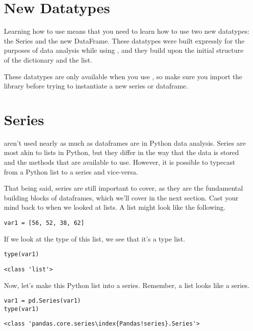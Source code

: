 \section{New Datatypes}
Learning how to use  means that you need to learn how to use two new datatypes: the Series and the new DataFrame. These datatypes were built expressly for the purposes of data analysis while using , and they build upon the initial structure of the dictionary and the list.\par
These datatypes are only available when you use , so make sure you import the  library before trying to instantiate a new series or dataframe.
\section{Series}
 aren't used nearly as much as dataframes are in Python data analysis. Series are most akin to lists in Python, but they differ in the way that the data is stored and the methods that are available to use. However, it is possible to typecast from a Python list to a  series and vice-versa.\par
That being said, series are still important to cover, as they are the fundamental building blocks of dataframes, which we'll cover in the next section. Cast your mind back to when we looked at lists. A list might look like the following.
\begin{lstlisting}[style=pippython]
var1 = [56, 52, 38, 62]
\end{lstlisting}
If we look at the type of this list, we see that it's a type list.
\begin{lstlisting}[style=pippython]
type(var1)
\end{lstlisting}
\begin{lstlisting}
<class 'list'>
\end{lstlisting}
Now, let's make this Python list into a  series. Remember, a list looks like a series.\par
\begin{lstlisting}[style=pippython]
var1 = pd.Series(var1)
type(var1)
\end{lstlisting}
\begin{lstlisting}
<class 'pandas.core.series\index{Pandas!series}.Series'>
\end{lstlisting}
